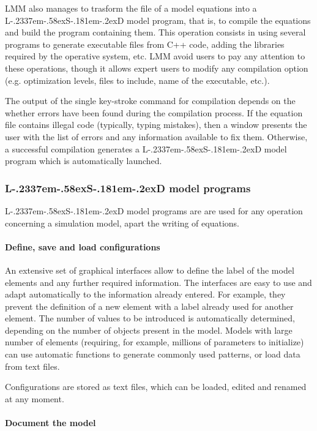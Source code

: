\documentclass [11pt,a4paper] {book}
\def\LsD{{L\kern-.2337em\lower-.58ex\hbox{S}\kern-.181em\lower-.2ex\hbox{D}}\xspace}
\begin{document}
LMM also manages to trasform the file of a model equations into a \LsD model program, that is, to compile the equations and build the program containing them. This operation consists in using several programs to generate executable files from C++ code, adding the libraries required by the operative system, etc. LMM avoid users to pay any attention to these operations, though it allows expert users to modify any compilation option (e.g. optimization levels, files to include, name of the executable, etc.). 

The output of the single key-stroke command for compilation depends on the whether errors have been found during the compilation process. If the equation file contains illegal code (typically, typing mistakes), then a window presents the user with the list of errors and any information available to fix them. Otherwise, a successful compilation generates a \LsD model program which is automatically launched.

\subsubsection{\LsD model programs}

\LsD model programs are are used for any operation concerning a simulation model, apart the writing of equations. 

\paragraph{Define, save and load configurations} 
An extensive set of graphical interfaces allow to define the label of the model elements and any further required information. The interfaces are easy to use and adapt automatically to the information already entered. For example, they prevent the definition of a new element with a label already used for another element. The number of values to be introduced is automatically determined, depending on the number of objects present in the model. Models with large number of elements (requiring, for example, millions of parameters to initialize) can use automatic functions to generate commonly used patterns, or load data from text files. 

Configurations are stored as text files, which can be loaded, edited and renamed at any moment.

\paragraph{Document the model}
\end{document}
